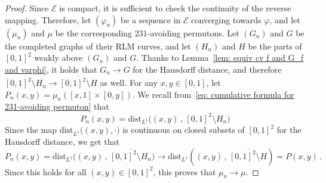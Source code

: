 \documentclass[a4paper,11pt]{amsart}
\theoremstyle{definition}
\begin{document}
\begin{proof}
	Since $\mathcal{E}$ is compact, it is sufficient to check the continuity of the reverse mapping. Therefore, let $(\varphi_n)$ be a sequence in $\mathcal{E}$ converging towards $\varphi$, and let $(\mu_n)$ and $\mu$ be the corresponding $231$-avoiding permutons. Let $(G_n)$ and $G$ be the completed graphs of their RLM curves, and let $(H_n)$ and $H$ be the parts of $[0,1]^2$ weakly above $(G_n)$ and $G$.
	Thanks to Lemma~\ref{lem: equiv cv f and G_f and varphi}, it holds that $G_n \to G$ for the Hausdorff distance, and therefore $\overline{[0,1]^2\setminus H_n} \to \overline{[0,1]^2\setminus H}$ as well.
	For any $x,y \in [0,1]$, let $P_n(x,y) = \mu_n\left( [x,1]\times[0,y] \right)$. We recall from~\eqref{eq: cumulative formula for 231-avoiding permuton} that
	\begin{equation}\label{eq: bicontinuity proof - cumulative formula for 231-avoiding permuton}
	P_n(x,y) = \mathrm{dist}_{L^1}\big( (x,y) \,,\, [0,1]^2\setminus H_n \big)
	\end{equation}
	Since the map $\mathrm{dist}_{L^1}\big( (x,y) , \cdot \big)$ is continuous on closed subsets of $[0,1]^2$ for the Hausdorff distance, we get that
	\[
	P_n(x,y) = \mathrm{dist}_{L^1}\big( (x,y) \,,\, \overline{[0,1]^2\setminus H_n} \big)
	\to \mathrm{dist}_{L^1}\left( (x,y) \,,\, \overline{[0,1]^2\setminus H} \right) = P(x,y) \,.
	\]
	Since this holds for all $(x,y)\in[0,1]^2$, this proves that $\mu_n \to \mu$.
	

\end{proof}
\end{document}
